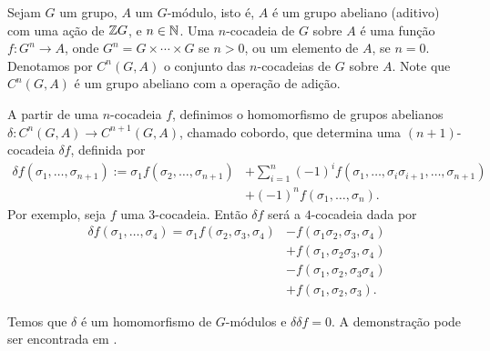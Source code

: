 Sejam $G$ um grupo, $A$ um $G$-módulo, isto é, $A$ é um grupo abeliano (aditivo) com uma ação de $\mathbb{Z} G$, e $n\in \mathbb{N}$. Uma $n$-cocadeia\label{diss:cocadeia} de $G$ sobre $A$ é uma função $f:G^n\rightarrow A$, onde $G^n = G\times \cdots \times G$ se $n>0$, ou um elemento de $A$, se $n=0$. Denotamos por $C^n(G,A)$ o conjunto das $n$-cocadeias de $G$ sobre $A$. Note que $C^n(G,A)$ é um grupo abeliano com a operação de adição.

A partir de uma $n$-cocadeia $f$, definimos o homomorfismo de grupos abelianos $\delta:C^n(G,A)\rightarrow C^{n+1}(G,A)$, chamado cobordo, que determina uma $(n+1)$-cocadeia $\delta f$, definida por 
\begin{align*}
    \delta f(\sigma_1,\dots,\sigma_{n+1}) := \sigma_1f(\sigma_2,\dots,\sigma_{n+1}) &+ \sum_{i=1}^{n}(-1)^i f(\sigma_1, \dots, \sigma_i\sigma_{i+1},\dots, \sigma_{n+1}) \\
    &+ (-1)^n f(\sigma_1, \dots, \sigma_n).
\end{align*}
Por exemplo, seja $f$ uma $3$-cocadeia. Então $\delta f$ será a $4$-cocadeia dada por
\begin{align*}
    \delta f(\sigma_1, \dots, \sigma_{4})=\sigma_1f(\sigma_2,\sigma_3,\sigma_4)  &- f(\sigma_1\sigma_2,\sigma_3,\sigma_4) \\
     &+ f(\sigma_1,\sigma_2\sigma_3,\sigma_4) \\
     &- f(\sigma_1,\sigma_2,\sigma_3\sigma_4) \\
     &+ f(\sigma_1, \sigma_2,\sigma_3).
\end{align*}

Temos que $\delta$ é um homomorfismo de $G$-módulos e $\delta\delta f =0$. A demonstração pode ser encontrada em \cite[p.52]{dis:cohomologia}.

